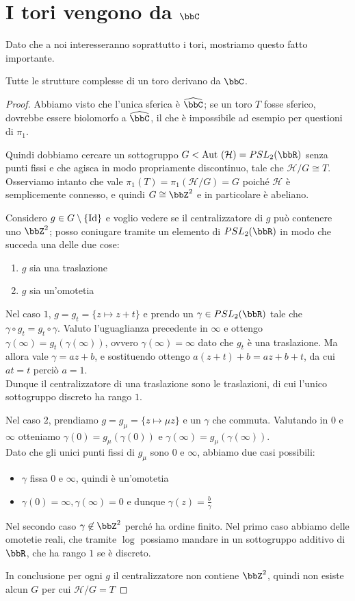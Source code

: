\section{I tori vengono da $\bbC$}
Dato che a noi interesseranno soprattutto i tori, mostriamo questo fatto importante.
\begin{teorema}
    Tutte le strutture complesse di un toro derivano da $\bbC$.
\end{teorema}
\begin{proof}
    Abbiamo visto che l'unica \sdR sferica è $\hat\bbC$; se un toro $T$ fosse sferico, dovrebbe essere biolomorfo a $\hat\bbC$, il che è impossibile ad esempio per questioni di $\pi_1$.

    Quindi dobbiamo cercare un sottogruppo $G<\Aut(\mathcal H)=PSL_2(\bbR)$ senza punti fissi e che agisca in modo propriamente discontinuo, tale che $\mathcal H / G \cong T$.\\
    Osserviamo intanto che vale $\pi_1(T)=\pi_1(\mathcal H / G) = G$ poiché $\mathcal H$ è semplicemente connesso, e quindi $G\cong \bbZ^2$ e in particolare è abeliano.

    Considero $g\in G \setminus \{\text{Id}\}$ e voglio vedere se il centralizzatore di $g$ può contenere uno $\bbZ^2$; posso coniugare tramite un elemento di $PSL_2(\bbR)$ in modo che succeda una delle due cose:
    \begin{enumerate}
        \item $g$ sia una traslazione
        \item $g$ sia un'omotetia
    \end{enumerate}
    Nel caso $1$, $g=g_t=\{z\mapsto z+t\}$ e prendo un $\gamma\in PSL_2(\bbR)$ tale che $\gamma\circ g_t = g_t\circ \gamma$. Valuto l'uguaglianza precedente in $\infty$ e ottengo $\gamma(\infty)=g_t(\gamma(\infty))$, ovvero $\gamma(\infty)=\infty$ dato che $g_t$ è una traslazione. Ma allora vale $\gamma = az+b$, e sostituendo ottengo $a(z+t)+b=az+b+t$, da cui $at=t$ perciò $a=1$.\\
    Dunque il centralizzatore di una traslazione sono le traslazioni, di cui l'unico sottogruppo discreto ha rango $1$.

    Nel caso $2$, prendiamo $g=g_\mu=\{z\mapsto \mu z\}$ e un $\gamma$ che commuta. Valutando in $0$ e $\infty$ otteniamo $\gamma(0)=g_\mu(\gamma(0))$ e $\gamma(\infty)=g_\mu(\gamma(\infty))$.\\
    Dato che gli unici punti fissi di $g_\mu$ sono $0$ e $\infty$, abbiamo due casi possibili:
    \begin{itemize}
        \item $\gamma$ fissa $0$ e $\infty$, quindi è un'omotetia
        \item $\gamma(0)=\infty,\gamma(\infty)=0$ e dunque $\gamma(z)=\frac b \gamma$
    \end{itemize}
    Nel secondo caso $\gamma\not\in\bbZ^2$ perché ha ordine finito. Nel primo caso abbiamo delle omotetie reali, che tramite $\log$ possiamo mandare in un sottogruppo additivo di $\bbR$, che ha rango $1$ se è discreto.

    In conclusione per ogni $g$ il centralizzatore non contiene $\bbZ^2$, quindi non esiste alcun $G$ per cui $\mathcal H / G = T$
\end{proof}
